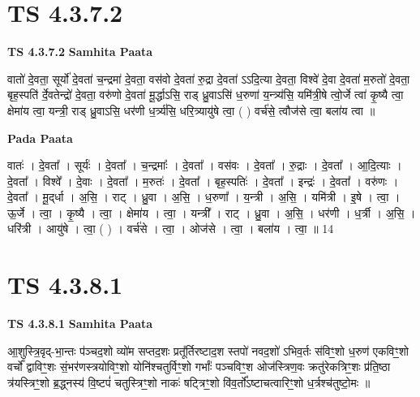 \documentclass[17pt]{extarticle}
\begin{document}

\section{ TS 4.3.7.2 }

\textbf{TS 4.3.7.2 } \newline
\textbf{Samhita Paata} \newline

वातो॑ दे॒वता॒ सूर्यो॑ दे॒वता॑ च॒न्द्रमा॑ दे॒वता॒ वस॑वो दे॒वता॑ रु॒द्रा दे॒वता॑ ऽऽदि॒त्या दे॒वता॒ विश्वे॑ दे॒वा दे॒वता॑ म॒रुतो॑ दे॒वता॒ बृह॒स्पति॑ र्दे॒वतेन्द्रो॑ दे॒वता॒ वरु॑णो दे॒वता॑ मू॒र्द्धाऽसि॒ राड् ध्रु॒वाऽसि॑ ध॒रुणा॑ य॒न्त्र्य॑सि॒ यमि॑त्री॒षे त्वो॒र्जे त्वा॑ कृ॒ष्यै त्वा॒ क्षेमा॑य त्वा॒ यन्त्री॒ राड् ध्रु॒वाऽसि॒ धर॑णी ध॒र्त्र्य॑सि॒ धरि॒त्र्यायु॑षे त्वा॒ ( ) वर्च॑से॒ त्वौज॑से त्वा॒ बला॑य त्वा ॥ \newline

\textbf{Pada Paata} \newline

वातः॑ । दे॒वता᳚ । सूर्यः॑ । दे॒वता᳚ । च॒न्द्रमाः᳚ । दे॒वता᳚ । वस॑वः । दे॒वता᳚ । रु॒द्राः । दे॒वता᳚ । आ॒दि॒त्याः । दे॒वता᳚ । विश्वे᳚ । दे॒वाः । दे॒वता᳚ । म॒रुतः॑ । दे॒वता᳚ । बृह॒स्पतिः॑ । दे॒वता᳚ । इन्द्रः॑ । दे॒वता᳚ । वरु॑णः । दे॒वता᳚ । मू॒द्‌र्धा । अ॒सि॒ । राट् । ध्रु॒वा । अ॒सि॒ । ध॒रुणा᳚ । य॒न्त्री । अ॒सि॒ । यमि॑त्री । इ॒षे । त्वा॒ । ऊ॒र्जे । त्वा॒ । कृ॒ष्यै । त्वा॒ । क्षेमा॑य । त्वा॒ । यन्त्री᳚ । राट् । ध्रु॒वा । अ॒सि॒ । धर॑णी । ध॒र्त्री । अ॒सि॒ । धरि॑त्री । आयु॑षे । त्वा॒ ( ) । वर्च॑से । त्वा॒ । ओज॑से । त्वा॒ । बला॑य । त्वा॒ ॥ 14  \newline





\section{ TS 4.3.8.1 }

\textbf{TS 4.3.8.1 } \newline
\textbf{Samhita Paata} \newline

आ॒शुस्त्रि॒वृद्-भा॒न्तः प॑ञ्चद॒शो व्यो॑म सप्तद॒शः प्रतू᳚र्तिरष्टाद॒श स्तपो॑ नवद॒शो॑ ऽभिव॒र्तः स॑विꣳ॒॒शो ध॒रुण॑ एकविꣳ॒॒शो वर्चो᳚ द्वाविꣳ॒॒शः सं॒भर॑णस्त्रयोविꣳ॒॒शो योनि॑श्चतुर्विꣳ॒॒शो गर्भाः᳚ पञ्चविꣳ॒॒श ओज॑स्त्रिण॒वः क्रतु॑रेकत्रिꣳ॒॒शः प्र॑ति॒ष्ठा त्र॑यस्त्रिꣳ॒॒शो ब्र॒द्ध्नस्य॑ वि॒ष्टपं॑ चतुस्त्रिꣳ॒॒शो नाकः॑ षट्त्रिꣳ॒॒शो वि॑व॒र्तो᳚ऽष्टाचत्वारिꣳ॒॒शो ध॒र्त्रश्च॑तुष्टो॒मः ॥ \newline
\end{document}
